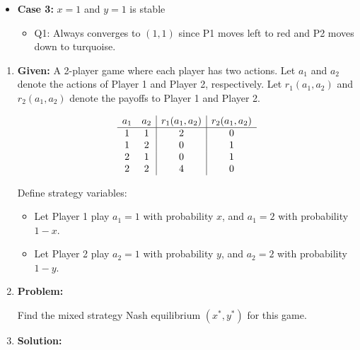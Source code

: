 \begin{example}
\begin{enumerate}
\begin{enumerate}
\begin{itemize}
\begin{itemize}
                \end{itemize}
                \item \textbf{Case 3:} $x=1$ and $y=1$ is stable
                \begin{itemize}
                    \item Q1: Always converges to $(1,1)$ since P1 moves left to red and P2 moves down to turquoise.
                \end{itemize}
            \end{itemize}
        \end{enumerate}
    \end{enumerate}
\end{example}
\newpage

\begin{example}
    \begin{enumerate}

        \item \textbf{Given:} A 2-player game where each player has two actions. Let $a_1$ and $a_2$ denote the actions of Player 1 and Player 2, respectively. Let $r_1(a_1, a_2)$ and $r_2(a_1, a_2)$ denote the payoffs to Player 1 and Player 2.
    
        \[
        \begin{array}{c c | c | c}
        a_1 & a_2 & r_1(a_1,a_2) & r_2(a_1,a_2) \\
        \hline
        1 & 1 & 2 & 0 \\
        1 & 2 & 0 & 1 \\
        2 & 1 & 0 & 1 \\
        2 & 2 & 4 & 0 \\
        \end{array}
        \]
    
        Define strategy variables:
        \begin{itemize}
            \item Let Player 1 play $a_1 = 1$ with probability $x$, and $a_1 = 2$ with probability $1 - x$.
            \item Let Player 2 play $a_2 = 1$ with probability $y$, and $a_2 = 2$ with probability $1 - y$.
        \end{itemize}
    
        \item \textbf{Problem:}
    
        Find the mixed strategy Nash equilibrium $(x^*, y^*)$ for this game.
    
        \item \textbf{Solution:}
    

\end{enumerate}
\end{example}

